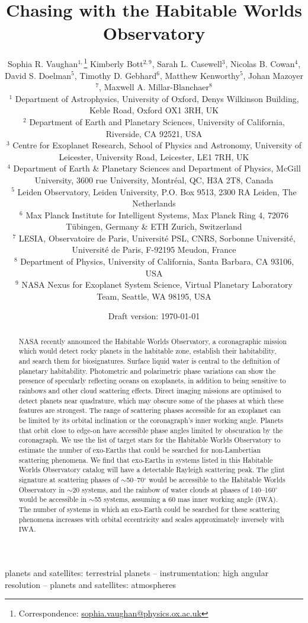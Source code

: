 \documentclass[
    usenatbib,
]{mnras}
\title{Chasing \rainbows{} with the Habitable Worlds Observatory}
\author[Sophia R. Vaughan et al.]{%
    Sophia R. Vaughan$^{1,}$\thanks{Correspondence:  \url{sophia.vaughan@physics.ox.ac.uk}}
    Kimberly Bott$^{2,9}$,
    Sarah L. Casewell$^{3}$,
    Nicolas B. Cowan$^{4}$,
    David S. Doelman$^{5}$,\newauthor
    Timothy D. Gebhard$^{6}$,
    Matthew Kenworthy$^{5}$,
    Johan Mazoyer$^{7}$,
    Maxwell A. Millar-Blanchaer$^{8}$
    \newauthor [remaining workshop participants in alphabetical order] \newauthor 
    \\
    $^{1}$ Department of Astrophysics, University of Oxford, Denys Wilkinson Building, Keble Road, Oxford OX1 3RH, UK\\
    $^{2}$ Department of Earth and Planetary Sciences, University of California, Riverside, CA 92521, USA \\
    $^{3}$ Centre for Exoplanet Research, School of Physics and Astronomy, University of Leicester, University Road, Leicester, LE1 7RH, UK\\
    $^{4}$ Department of Earth \& Planetary Sciences and Department of Physics, McGill University, 3600 rue University, Montréal, QC, H3A 2T8, Canada\\
    $^{5}$ Leiden Observatory, Leiden University, P.O. Box 9513, 2300 RA Leiden, The Netherlands\\
    $^{6}$ Max Planck Institute for Intelligent Systems, Max Planck Ring 4, 72076 Tübingen, Germany \& ETH Zurich, Switzerland \\
    $^{7}$ LESIA, Observatoire de Paris, Université PSL, CNRS, Sorbonne Université, Université de Paris, F-92195 Meudon, France \\
    $^{8}$ Department of Physics, University of California, Santa Barbara, CA 93106, USA \\
    $^{9}$ NASA Nexus for Exoplanet System Science, Virtual Planetary Laboratory Team, Seattle, WA 98195, USA
}
\date{Draft version: \today}
\newcommand{\IWA}{\ensuremath{\mathrm{IWA}}}
\begin{document}
 

\maketitle

\begin{abstract}
NASA recently announced the Habitable Worlds Observatory, a coronagraphic mission which would detect rocky planets in the habitable zone, establish their habitability, and search them for biosignatures. 
Surface liquid water is central to the definition of planetary habitability.
%
Photometric and polarimetric phase variations can show the presence of specularly reflecting oceans on exoplanets, in addition to being sensitive to rainbows and other cloud scattering effects. Direct imaging missions are optimised to detect planets near quadrature, which may obscure some of the phases at which these features are strongest. The range of scattering phases accessible for an exoplanet can be limited by its orbital inclination or the coronagraph's inner working angle. Planets that orbit close to edge-on have accessible phase angles limited by obscuration by the coronagraph. We use the list of target stars for the Habitable Worlds Observatory to estimate the number of exo-Earths that could be searched for non-Lambertian scattering phenomena. We find that exo-Earths in systems listed in this Habitable Worlds Observatory catalog will have a detectable Rayleigh scattering peak. The glint signature at scattering phases of $\sim$50--70$^\circ$ would be accessible to the Habitable Worlds Observatory in $\sim$20 systems, and the rainbow of water clouds at phases of 140--160$^\circ$ would be accessible in $\sim$55 systems, assuming a 60 mas inner working angle (\IWA). The number of systems in which an exo-Earth could be searched for these scattering phenomena increases with orbital eccentricity and scales approximately inversely with \IWA.       


\end{abstract}

\begin{keywords}
planets and satellites: terrestrial planets -- instrumentation: high angular resolution -- planets and satellites: atmospheres
\end{keywords}
\end{document}
